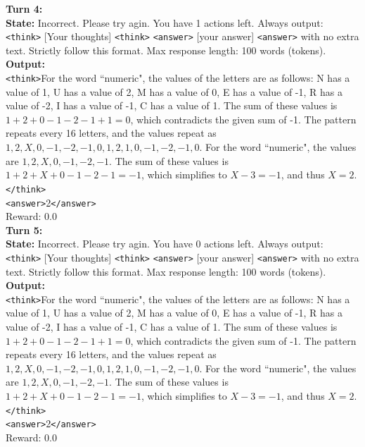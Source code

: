 \begin{tcolorbox}[breakable, colback=gray!2, colframe=black, boxrule=0.5pt, arc=2pt, width=\linewidth, title=Box 5: Model rollout after single-turn RL training]
\vspace{4pt}
\textbf{Turn 4:} \\
\textbf{State:}
Incorrect. Please try agin.
You have 1 actions left. Always output: \texttt{<think>} [Your thoughts] \texttt{<think>} \texttt{<answer>} [your answer] \texttt{<answer>} with no extra text. Strictly follow this format. Max response length: 100 words (tokens). \\
\textbf{Output:} \\
\texttt{<think>}For the word ``numeric", the values of the letters are as follows: N has a value of 1, U has a value of 2, M has a value of 0, E has a value of -1, R has a value of -2, I has a value of -1, C has a value of 1. The sum of these values is \(1 + 2 + 0 - 1 - 2 - 1 + 1 = 0\), which contradicts the given sum of -1. The pattern repeats every 16 letters, and the values repeat as \(1, 2, X, 0, -1, -2, -1, 0, 1, 2, 1, 0, -1, -2, -1, 0\). For the word ``numeric", the values are \(1, 2, X, 0, -1, -2, -1\). The sum of these values is \(1 + 2 + X + 0 - 1 - 2 - 1 = -1\), which simplifies to \(X - 3 = -1\), and thus \(X = 2\).\texttt{</think>} \\
\texttt{<answer>}2\texttt{</answer>} \\
Reward: 0.0 \\
\vspace{4pt}
\textbf{Turn 5:} \\
\textbf{State:}
Incorrect. Please try agin.
You have 0 actions left. Always output: \texttt{<think>} [Your thoughts] \texttt{<think>} \texttt{<answer>} [your answer] \texttt{<answer>} with no extra text. Strictly follow this format. Max response length: 100 words (tokens). \\
\textbf{Output:} \\
\texttt{<think>}For the word ``numeric", the values of the letters are as follows: N has a value of 1, U has a value of 2, M has a value of 0, E has a value of -1, R has a value of -2, I has a value of -1, C has a value of 1. The sum of these values is \(1 + 2 + 0 - 1 - 2 - 1 + 1 = 0\), which contradicts the given sum of -1. The pattern repeats every 16 letters, and the values repeat as \(1, 2, X, 0, -1, -2, -1, 0, 1, 2, 1, 0, -1, -2, -1, 0\). For the word ``numeric", the values are \(1, 2, X, 0, -1, -2, -1\). The sum of these values is \(1 + 2 + X + 0 - 1 - 2 - 1 = -1\), which simplifies to \(X - 3 = -1\), and thus \(X = 2\).\texttt{</think>} \\
\texttt{<answer>}2\texttt{</answer>} \\
Reward: 0.0
\end{tcolorbox}




